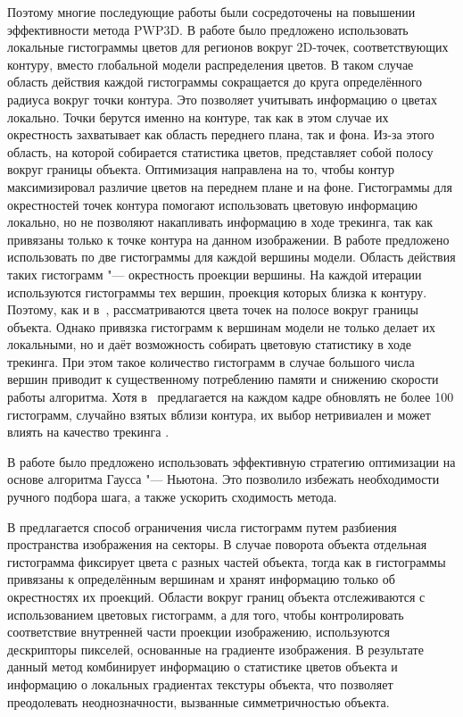 
Поэтому многие последующие работы были сосредоточены на повышении
эффективности метода PWP3D.
В работе \cite{Hexner2016} было предложено использовать локальные гистограммы
цветов для регионов вокруг 2D-точек, соответствующих контуру, вместо глобальной
модели распределения цветов.
В таком случае область действия каждой гистограммы сокращается до круга
определённого радиуса вокруг точки контура.
Это позволяет учитывать информацию о цветах локально.
Точки берутся именно на контуре, так как в этом случае их окрестность
захватывает как область переднего плана, так и фона.
Из-за этого область, на которой собирается статистика цветов, представляет
собой полосу вокруг границы объекта.
Оптимизация направлена на то, чтобы контур максимизировал различие цветов на
переднем плане и на фоне.
Гистограммы для окрестностей точек контура помогают использовать цветовую
информацию локально, но не позволяют накапливать информацию в ходе трекинга,
так как привязаны только к точке контура на данном изображении.
В работе \cite{Tjaden2017} предложено использовать по две гистограммы для
каждой вершины модели.
Область действия таких гистограмм "--- окрестность проекции вершины.  На каждой
итерации используются гистограммы тех вершин, проекция которых близка к
контуру.
Поэтому, как и в~\cite{Hexner2016}, рассматриваются цвета точек на полосе
вокруг границы объекта.
Однако привязка гистограмм к вершинам модели не только делает их локальными, но
и даёт возможность собирать цветовую статистику в ходе трекинга.
При этом такое количество гистограмм в случае большого числа вершин приводит к
существенному потреблению памяти и снижению скорости работы алгоритма.
Хотя в~\cite{Tjaden2017} предлагается на каждом кадре обновлять не более 100
гистограмм, случайно взятых вблизи контура, их выбор нетривиален и может влиять
на качество трекинга
.

В работе \cite{Tjaden2018} было предложено использовать
эффективную стратегию оптимизации на основе алгоритма Гаусса "--- Ньютона.
Это позволило избежать необходимости ручного подбора шага, а также ускорить
сходимость метода.


В \cite{Zhong2018} предлагается способ ограничения числа гистограмм путем
разбиения пространства изображения на секторы.
В случае поворота объекта отдельная гистограмма фиксирует цвета с разных частей
объекта, тогда как в \cite{Tjaden2017} гистограммы привязаны к определённым
вершинам и хранят информацию только об окрестностях их проекций.
Области вокруг границ объекта отслеживаются с использованием цветовых
гистограмм, а для того, чтобы контролировать соответствие внутренней части
проекции изображению, используются дескрипторы пикселей, основанные на
градиенте изображения.
В результате данный метод комбинирует информацию о статистике цветов объекта и
информацию о локальных градиентах текстуры объекта, что позволяет преодолевать
неоднозначности, вызванные симметричностью объекта.

